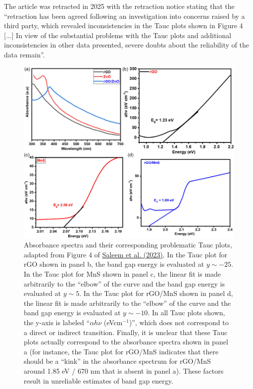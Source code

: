 \documentclass[letterpaper, 12pt]{article}
\begin{document}
The article was retracted in 2025 with the retraction notice stating that the ``retraction has been agreed following an investigation into concerns raised by a third party, which revealed inconsistencies in the Tauc plots shown in Figure 4 [...] In view of the substantial problems with the Tauc plots and additional inconsistencies in other data presented, severe doubts about the reliability of the data remain''.

\begin{figure}[h!tbp]
    \centering
    \includegraphics[width=\textwidth]{img/tauc/image-1719173331222.png}
    \caption*{Absorbance spectra and their corresponding problematic Tauc plots, adapted from Figure 4 of \href{https://doi.org/10.1002/pssa.202200734}{Saleem et al. (2023)}. In the Tauc plot for rGO shown in panel b, the band gap energy is evaluated at $y \sim -25$. In the Tauc plot for MnS shown in panel c, the linear fit is made arbitrarily to the ``elbow'' of the curve and the band gap energy is evaluated at $y \sim 5$. In the Tauc plot for rGO/MnS shown in panel d, the linear fit is made arbitrarily to the ``elbow'' of the curve and the band gap energy is evaluated at $y \sim -10$. In all Tauc plots shown, the y-axis is labeled ``$\alpha h \nu$ (eVcm$^{-1}$)'', which does not correspond to a direct or indirect transition. Finally, it is unclear that these Tauc plots actually correspond to the absorbance spectra shown in panel a (for instance, the Tauc plot for rGO/MnS indicates that there should be a ``kink'' in the absorbance spectrum for rGO/MnS around 1.85 eV / 670 nm that is absent in panel a). These factors result in unreliable estimates of band gap energy.}
\end{figure}
\end{document}
